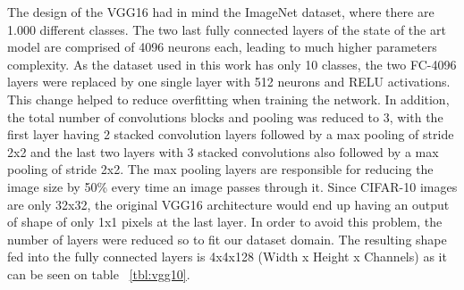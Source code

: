 The design of the VGG16 had in mind the ImageNet dataset, where there are 1.000 different classes. The two last fully connected layers of the state of the art model are comprised of 4096 neurons each, leading to much higher parameters complexity. As the dataset used in this work has only 10 classes, the two FC-4096 layers were replaced by one single layer with 512 neurons and RELU activations. This change helped to reduce overfitting when training the network. In addition, the total number of convolutions blocks and pooling was reduced to 3, with the first layer having 2 stacked convolution layers followed by a max pooling of stride 2x2 and the last two layers with 3 stacked convolutions also followed by a max pooling of stride 2x2. The max pooling layers are responsible for reducing the image size by 50\% every time an image passes through it. Since CIFAR-10 images are only 32x32, the original VGG16 architecture would end up having an output of shape of only 1x1 pixels at the last layer. In order to avoid this problem, the number of layers were reduced so to fit our dataset domain. The resulting shape fed into the fully connected layers is 4x4x128 (Width x Height x Channels) as it can be seen on table ~\ref{tbl:vgg10}. 

